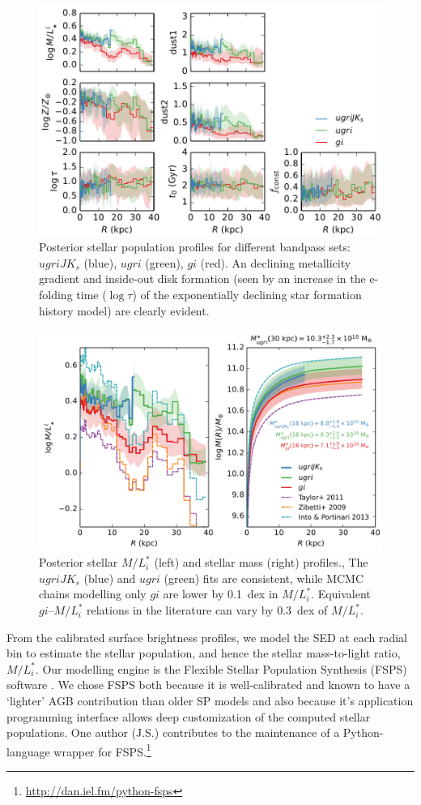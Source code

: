 \documentclass{iau}
\begin{document}
\begin{figure}
\centering
\includegraphics[width=0.7\columnwidth]{pop_profile} 
\caption{Posterior stellar population profiles for different bandpass sets: $ugriJK_s$ (blue), $ugri$ (green), $gi$ (red).
An declining metallicity gradient and inside-out disk formation (seen by an increase in the e-folding time ($\log \tau$) of the exponentially declining star formation history model) are clearly evident.}
\label{fig:pop_profile}
\end{figure}

\begin{figure}
\centering
\includegraphics[width=0.7\columnwidth]{mass_profile} 
\caption{Posterior stellar $M/L_i^*$ (left) and stellar mass (right) profiles.,
The $ugriJK_s$ (blue) and $ugri$ (green) fits are consistent, while MCMC chains modelling only $gi$ are lower by 0.1~dex in $M/L_i^*$.
Equivalent $gi$--$M/L_i^*$ relations in the literature can vary by 0.3~dex of $M/L_i^*$.}
\label{fig:mass_profile}
\end{figure}

From the calibrated surface brightness profiles, we model the SED at each radial bin to estimate the stellar population, and hence the stellar mass-to-light ratio, $M/L_i^*$.
Our modelling engine is the Flexible Stellar Population Synthesis (FSPS) software \citep{Conroy:2009,Conroy:2010}.
We chose FSPS both because it is well-calibrated and known to have a `lighter' AGB contribution than older SP models \citep[e.g.,][]{Bruzual:2003} and also because it's application programming interface allows deep customization of the computed stellar populations.
One author (J.S.) contributes to the maintenance of a Python-language wrapper for FSPS.\footnote{\url{http://dan.iel.fm/python-fsps}}
\end{document}
